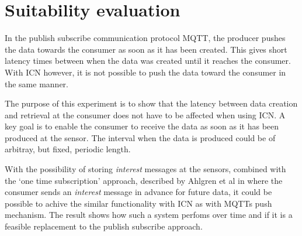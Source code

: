 \section{Suitability evaluation}





In the publish subscribe communication protocol MQTT, the producer pushes the data towards the consumer as soon as it has been created. This gives short latency times between when the data was created until it reaches the consumer. With ICN however, it is not possible to push the data toward the consumer in the same manner.

The purpose of this experiment is to show that the latency between data creation and retrieval at the consumer does not have to be affected when using ICN. 
A key goal is to enable the consumer to receive the data as soon as it has been produced at the sensor. The interval when the data is produced could be of arbitray, but fixed, periodic length. 

With the possibility of storing \textit{interest} messages at the sensors, combined with the `one time subscription' approach, described by Ahlgren et al in \cite{Ahlgreniot} where the consumer sends an \textit{interest} message in advance for future data, it could be possible to achive the similar functionality with ICN as with MQTTs push mechanism. The result shows how such a system perfoms over time and if it is a feasible replacement to the publish subscribe approach.

